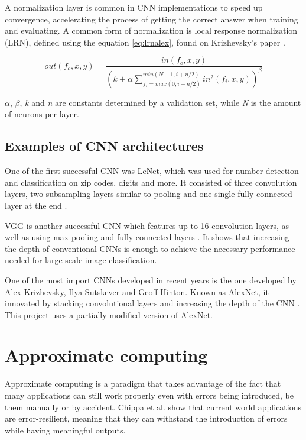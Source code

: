 A normalization layer is common in CNN implementations to speed up convergence, accelerating
the process of getting the correct answer when training and evaluating.
A common form of normalization is local response normalization (LRN), defined
using the equation \ref{eq:lrnalex}, found on Krizhevsky's paper \cite{krizhevsky2012imagenet}.

\begin{equation} \label{eq:lrnalex}
  out(f_o,x,y)
  =
  \frac{in(f_o,x,y)}
  {\left(k+\alpha\sum_{f_i=max(0,i-n/2)}^{min(N-1,i+n/2)}in^2(f_i,x,y)\right)^\beta}
\end{equation}

$\alpha$, $\beta$, {\textit{k}}
and \textit{n}
are constants determined by a validation set,
while \textit{N}
is the amount of neurons per layer.

\subsection{Examples of CNN architectures}

One of the first successful CNN was LeNet, which was used for number detection
and classification on zip codes, digits and more. It consisted of three convolution
layers, two subsampling layers similar to pooling and one single fully-connected
layer at the end \cite{lecun1998gradient}.

VGG is another successful CNN which features up to 16 convolution layers, as well
as using max-pooling and fully-connected layers \cite{simonyan2014very}. It shows
that increasing the depth of conventional CNNs is enough to achieve the necessary
performance needed for large-scale image classification.

One of the most import CNNs developed in recent years is the one developed by 
Alex Krizhevsky, Ilya Sutskever and Geoff Hinton. Known as AlexNet, it innovated
by stacking convolutional layers and increasing the depth of the CNN \cite{krizhevsky2012imagenet}. 
This project uses a partially modified version of AlexNet.


\section{Approximate computing}

Approximate computing is a paradigm that takes advantage of the fact that
many applications can still work properly even with errors being introduced, be them
manually or by accident. Chippa et al. \cite{chippa2013analysis} show that current world
applications are error-resilient, meaning that they can withstand the introduction of errors
while having meaningful outputs.

